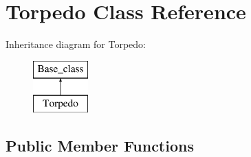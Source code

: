 \hypertarget{classTorpedo}{}\section{Torpedo Class Reference}
\label{classTorpedo}
Inheritance diagram for Torpedo\+:\begin{figure}[H]
\begin{center}
\leavevmode
\includegraphics[height=2.000000cm]{classTorpedo}
\end{center}
\end{figure}
\subsection*{Public Member Functions}
